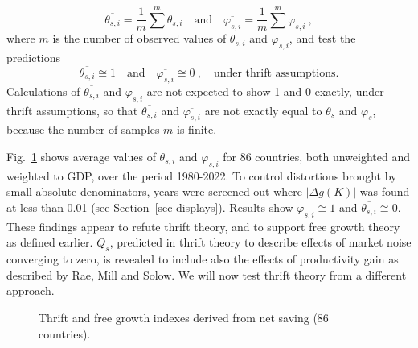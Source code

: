 \documentclass[a4paper,fleqn]{latex_styles/cas-sc}
\begin{document}
%
%
\[\overline{\theta_{s,i}} = \frac{1}{m} \sum^{m} \theta_{s,i} \quad \text{and} \quad
\overline{\varphi_{s,i}} = \frac{1}{m} \sum^{m} \varphi_{s,i}\ ,\]
%
where \(m\) is the number of observed values of \(\theta_{s,i}\) and
\(\varphi_{s,i}\), and test the predictions
\[
\overline{\theta_{s,i}} \cong 1 \quad \text{and} \quad \overline{\varphi_{s,i}} \cong 0\ , \quad \text{under thrift assumptions.}
\]
%
Calculations of \(\overline{\theta_{s,i}}\) and
\(\overline{\varphi_{s,i}}\) are not expected to show 1 and 0 exactly,
under thrift assumptions, so that \(\overline{\theta_{s,i}}\) and \(\overline{\varphi_{s,i}}\) are not exactly equal to \(\theta_s\) and \(\varphi_s\), because the number of samples \(m\) is finite.

Fig.~\ref{fig-si_plots} shows average values of \(\theta_{s,i}\) and
\(\varphi_{s,i}\) for 86 countries, both unweighted and weighted to GDP,
over the period 1980-2022. To control distortions brought by small
absolute denominators, years were screened out where \(|\Delta g(K)|\)
was found at less than 0.01 (see Section~\ref{sec-displays}). Results
show \(\overline{\varphi_{s,i}} \cong 1\) and \(\overline{\theta_{s,i}} \cong 0\). These findings
appear to refute thrift theory, and to support free growth theory as
defined earlier. \(Q_s\), predicted in thrift theory to describe effects
of market noise converging to zero, is revealed to include also the
effects of productivity gain as described by Rae, Mill and Solow. We
will now test thrift theory from a different approach.
%
\FloatBarrier
\begin{figure}[pos=H]
    \centering
    \quad %
    \captionsetup{justification=centering}
    \caption{Thrift and free growth indexes derived from net saving (86 countries).}
    \label{fig-si_plots}
\end{figure}
\end{document}
